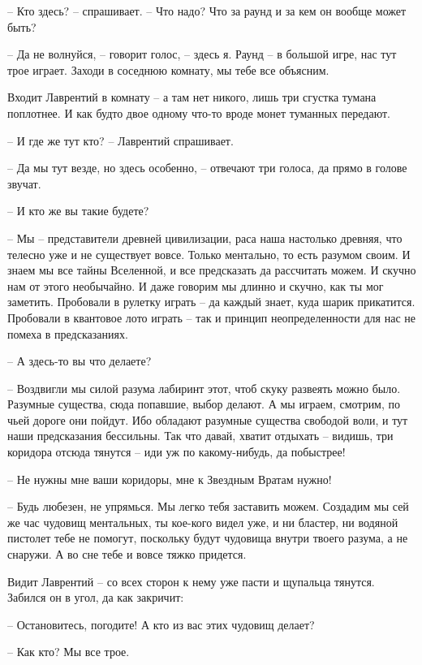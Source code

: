 \documentclass[ebook,oneside,final,openright]{memoir}
\begin{document}
– Кто здесь? – спрашивает. – Что надо? Что за раунд и за кем он вообще может быть?\par
– Да не волнуйся, – говорит голос, – здесь я. Раунд – в большой игре, нас тут трое играет. Заходи в соседнюю комнату, мы тебе все объясним.\par
 \par
Входит Лаврентий в комнату – а там нет никого, лишь три сгустка тумана поплотнее. И как будто двое одному что-то вроде монет туманных передают.\par
– И где же тут кто? – Лаврентий спрашивает.\par
– Да мы тут везде, но здесь особенно, – отвечают три голоса, да прямо в голове звучат.\par
– И кто же вы такие будете?\par
– Мы – представители древней цивилизации, раса наша настолько древняя, что телесно уже и не существует вовсе. Только ментально, то есть разумом своим. И знаем мы все тайны Вселенной, и все предсказать да рассчитать можем. И скучно нам от этого необычайно. И даже говорим мы длинно и скучно, как ты мог заметить. Пробовали в рулетку играть – да каждый знает, куда шарик прикатится. Пробовали в квантовое лото играть – так и принцип неопределенности для нас не помеха в предсказаниях.\par
– А здесь-то вы что делаете?\par
– Воздвигли мы силой разума лабиринт этот, чтоб скуку развеять можно было. Разумные существа, сюда попавшие, выбор делают. А мы играем, смотрим, по чьей дороге они пойдут. Ибо обладают разумные существа свободой воли, и тут наши предсказания бессильны. Так что давай, хватит отдыхать – видишь, три коридора отсюда тянутся – иди уж по какому-нибудь, да побыстрее!\par
– Не нужны мне ваши коридоры, мне к Звездным Вратам нужно!\par
– Будь любезен, не упрямься. Мы легко тебя заставить можем. Создадим мы сей же час чудовищ ментальных, ты кое-кого видел уже, и ни бластер, ни водяной пистолет тебе не помогут, поскольку будут чудовища внутри твоего разума, а не снаружи. А во сне тебе и вовсе тяжко придется.\par
\par
Видит Лаврентий – со всех сторон к нему уже пасти и щупальца тянутся. Забился он в угол, да как закричит:\par
– Остановитесь, погодите! А кто из вас этих чудовищ делает?\par
– Как кто? Мы все трое.\par
\end{document}
